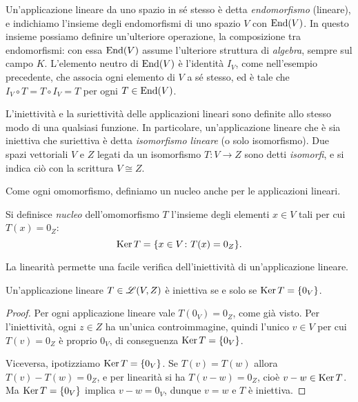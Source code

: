 Un'applicazione lineare da uno spazio in s\'e stesso è detta \emph{endomorfismo} (lineare), e indichiamo l'insieme degli endomorfismi di uno spazio $V$ con $\operatorname{End}(V)$.
In questo insieme possiamo definire un'ulteriore operazione, la composizione tra endomorfismi: con essa $\operatorname{End}(V)$ assume l'ulteriore struttura di \emph{algebra}, sempre sul campo $K$.
L'elemento neutro di $\operatorname{End}(V)$ è l'identità $I_V$, come nell'esempio precedente, che associa ogni elemento di $V$ a s\'e stesso, ed è tale che $I_V\circ T=T\circ I_V=T$ per ogni $T\in\operatorname{End}(V)$.

L'iniettività e la suriettività delle applicazioni lineari sono definite allo stesso modo di una qualsiasi funzione.
In particolare, un'applicazione lineare che è sia iniettiva che suriettiva è detta \emph{isomorfismo lineare} (o solo isomorfismo).
Due spazi vettoriali $V$ e $Z$ legati da un isomorfismo $T\colon V\to Z$ sono detti \emph{isomorfi}, e si indica ciò con la scrittura $V\cong Z$.

Come ogni omomorfismo, definiamo un nucleo anche per le applicazioni lineari.
\begin{definizione} \label{d:nucleo-applicazione-lineare}
	Si definisce \emph{nucleo} dell'omomorfismo $T$ l'insieme degli elementi $x\in V$ tali per cui $T(x)=0_Z$:
	\begin{equation*}
		\operatorname{Ker} T=\{x\in V\colon T(x)=0_Z\}.
	\end{equation*}
\end{definizione}
La linearità permette una facile verifica dell'iniettività di un'applicazione lineare.
\begin{teorema} \label{t:iniettivita-nucleo}
	Un'applicazione lineare $T\in\mathscr L(V,Z)$ è iniettiva se e solo se $\operatorname{Ker} T=\{0_V\}$.
\end{teorema}
\begin{proof}
	Per ogni applicazione lineare vale $T(0_V)=0_Z$, come già visto.
	Per l'iniettività, ogni $z\in Z$ ha un'unica controimmagine, quindi l'unico $v\in V$ per cui $T(v)=0_Z$ è proprio $0_V$, di conseguenza $\operatorname{Ker} T=\{0_V\}$.

	Viceversa, ipotizziamo $\operatorname{Ker} T=\{0_V\}$.
	Se $T(v)=T(w)$ allora $T(v)-T(w)=0_Z$, e per linearità si ha $T(v-w)=0_Z$, cioè $v-w\in\operatorname{Ker} T$.
	Ma $\operatorname{Ker} T=\{0_V\}$ implica $v-w=0_V$, dunque $v=w$ e $T$ è iniettiva.
\end{proof}

